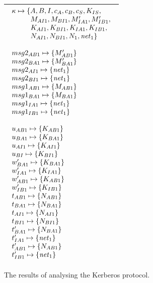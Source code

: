 \documentclass[10pt,a4paper,final,oneside,fleqn]{book}
\begin{document}
\begin{figure}[!tbp]
\begin{center}
\begin{tabular}{|l|}
\hline
$\begin{array}{l}
\kappa\mapsto\{A,B,I,c_A,c_B,c_S,K_{IS},\\
~~~~~~~~M_{AI1},M_{BI1},M'_{IA1},M'_{IB1},\\
~~~~~~~~K_{AI1}, K_{BI1}, K_{IA1}, K_{IB1},\\
~~~~~~~~N_{AI1}, N_{BI1}, N_{1}, \mbox{{\itshape net\/}}_1\}\\\\
msg2_{AB1}\mapsto\{M'_{AB1}\}\\
msg2_{BA1}\mapsto\{M'_{BA1}\}\\
msg2_{AI1}\mapsto\{\mbox{{\itshape net\/}}_1\}\\
msg2_{BI1}\mapsto\{\mbox{{\itshape net\/}}_1\}\\
msg1_{AB1}\mapsto\{M_{AB1}\}\\
msg1_{BA1}\mapsto\{M_{BA1}\}\\
msg1_{IA1}\mapsto\{\mbox{{\itshape net\/}}_1\}\\
msg1_{IB1}\mapsto\{\mbox{{\itshape net\/}}_1\}\\\\
u_{AB1}\mapsto\{K_{AB1}\}\\
u_{BA1}\mapsto\{K_{BA1}\}\\
u_{AI1}\mapsto\{K_{AI1}\}\\
u_{BI}\mapsto\{K_{BI1}\}\\
w'_{BA1}\mapsto\{K_{BA1}\}\\
w'_{IA1}\mapsto\{K_{IA1}\}\\
w'_{AB1}\mapsto\{K_{AB1}\}\\
w'_{IB1}\mapsto\{K_{IB1}\}\\
t_{AB1}\mapsto\{N_{AB1}\}\\
t_{BA1}\mapsto\{N_{BA1}\}\\
t_{AI1}\mapsto\{N_{AI1}\}\\
t_{BI1}\mapsto\{N_{BI1}\}\\
t'_{BA1}\mapsto\{N_{BA1}\}\\
t'_{IA1}\mapsto\{\mbox{{\itshape net\/}}_1\}\\
t'_{AB1}\mapsto\{N_{AB1}\}\\
t'_{IB1}\mapsto\{\mbox{{\itshape net\/}}_1\}
\end{array}$\\
\hline
\end{tabular}
\end{center}
\caption{The results of analysing the Kerberos protocol.\label{anker}}
\end{figure}
\end{document}
